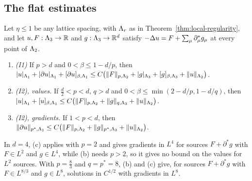\subsection{The flat estimates}\label{ss:43.2}

\begin{theorem}\label{thm:lp-local}
Let $\eta\le1$ be any lattice spacing, with $\Lambda_r$ as in Theorem~\ref{thm:local-regularity}, and let $u,F:\Lambda_3\to\mathbb R$ and $g:\Lambda_3\to\mathbb R^d$ satisfy $-\Delta u=F+\sum_\mu\partial^*_\mu g_\mu$ at every point of $\Lambda_2$.
\begin{enumerate}[label=(\alph*)]
\item \emph{(I1)} If $p>d$ and $0<\beta\le1-d/p$, then $|u|_{\Lambda_1}+|\partial u|_{\Lambda_1}+[\partial u]_{\beta,\Lambda_1}\le C\big(\|F\|_{p,\Lambda_2}+|g|_{\Lambda_3}+[g]_{\beta,\Lambda_3}+\|u\|_{\Lambda_2}\big)$.
\item \emph{(I2), values.} If $\frac d2<p<d$, $q>d$ and $0<\beta\le\min(2-d/p,1-d/q)$, then $|u|_{\Lambda_1}+[u]_{\beta,\Lambda_1}\le C\big(\|F\|_{p,\Lambda_2}+\|g\|_{q,\Lambda_3}+\|u\|_{\Lambda_2}\big)$.
\item \emph{(I2), gradients.} If $1<p<d$, then $\|\partial u\|_{p^*,\Lambda_1}\le C\big(\|F\|_{p,\Lambda_2}+\|g\|_{p^*,\Lambda_3}+\|u\|_{\Lambda_2}\big)$.
\end{enumerate}
In $d=4$, (c) applies with $p=2$ and gives gradients in $L^4$ for sources $F+\partial^*g$ with $F\in L^2$ and $g\in L^4$, while (b) needs $p>2$, so it gives no bound on the values for $L^2$ sources. With $p=\frac83$ and $q=p^*=8$, (b) and (c) give, for sources $F+\partial^*g$ with $F\in L^{8/3}$ and $g\in L^8$, solutions in $C^{1/2}$ with gradients in $L^8$.
\end{theorem}

